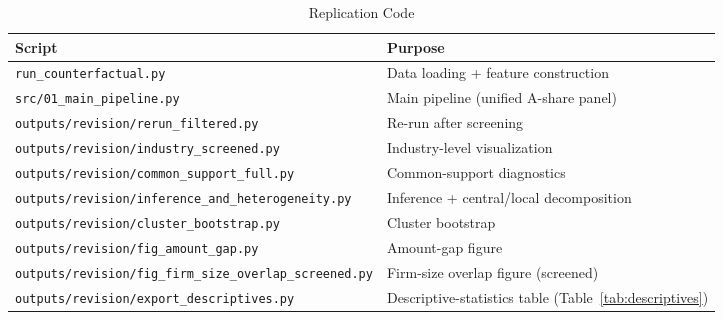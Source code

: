 \documentclass[11pt,a4paper]{article}
\begin{document}
\begin{table}[htbp]
\centering
\caption{Replication Code}
\label{tab:code}
\begin{threeparttable}
\small
\begin{tabularx}{\linewidth}{l >{\raggedright\arraybackslash}X}
\toprule
Script & Purpose \\
\midrule
\texttt{run\_counterfactual.py} & Data loading + feature construction \\
\texttt{src/01\_main\_pipeline.py} & Main pipeline (unified A-share panel) \\
\texttt{outputs/revision/rerun\_filtered.py} & Re-run after screening \\
\texttt{outputs/revision/industry\_screened.py} & Industry-level visualization \\
\texttt{outputs/revision/common\_support\_full.py} & Common-support diagnostics \\
\texttt{outputs/revision/inference\_and\_heterogeneity.py} & Inference + central/local decomposition \\
\texttt{outputs/revision/cluster\_bootstrap.py} & Cluster bootstrap \\
\texttt{outputs/revision/fig\_amount\_gap.py} & Amount-gap figure \\
\texttt{outputs/revision/fig\_firm\_size\_overlap\_screened.py} & Firm-size overlap figure (screened) \\
\texttt{outputs/revision/export\_descriptives.py} & Descriptive-statistics table (Table~\ref{tab:descriptives}) \\
\bottomrule
\end{tabularx}
\end{threeparttable}
\end{table}
\end{document}
